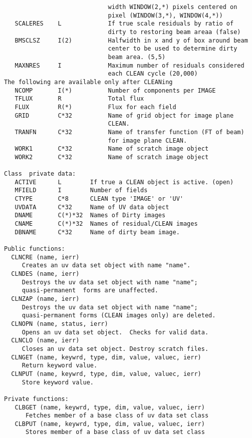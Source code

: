 {\begin{verbatim}
                             width WINDOW(2,*) pixels centered on
                             pixel (WINDOW(3,*), WINDOW(4,*))
   SCALERES    L             If true scale residuals by ratio of
                             dirty to restoring beam areaa (false)
   BMSCLSZ     I(2)          Halfwidth in x and y of box around beam
                             center to be used to determine dirty
                             beam area. (5,5)
   MAXNRES     I             Maximum number of residuals considered
                             each CLEAN cycle (20,000)
The following are available only after CLEANing
   NCOMP       I(*)          Number of components per IMAGE
   TFLUX       R             Total flux
   FLUX        R(*)          Flux for each field
   GRID        C*32          Name of grid object for image plane
                             CLEAN.
   TRANFN      C*32          Name of transfer function (FT of beam)
                             for image plane CLEAN.
   WORK1       C*32          Name of scratch image object
   WORK2       C*32          Name of scratch image object

Class  private data:
   ACTIVE      L        If true a CLEAN object is active. (open)
   MFIELD      I        Number of fields
   CTYPE       C*8      CLEAN type 'IMAGE' or 'UV'
   UVDATA      C*32     Name of UV data object
   DNAME       C(*)*32  Names of Dirty images
   CNAME       C(*)*32  Names of residual/CLEAN images
   DBNAME      C*32     Name of dirty beam image.

Public functions:
  CLNCRE (name, ierr)
     Creates an uv data set object with name "name".
  CLNDES (name, ierr)
     Destroys the uv data set object with name "name";
     quasi-permanent  forms are unaffected.
  CLNZAP (name, ierr)
     Destroys the uv data set object with name "name";
     quasi-permanent forms (CLEAN images only) are deleted.
  CLNOPN (name, status, ierr)
     Opens an uv data set object.  Checks for valid data.
  CLNCLO (name, ierr)
     Closes an uv data set object. Destroy scratch files.
  CLNGET (name, keywrd, type, dim, value, valuec, ierr)
     Return keyword value.
  CLNPUT (name, keywrd, type, dim, value, valuec, ierr)
     Store keyword value.

Private functions:
   CLBGET (name, keywrd, type, dim, value, valuec, ierr)
      Fetches member of a base class of uv data set class
   CLBPUT (name, keywrd, type, dim, value, valuec, ierr)
      Stores member of a base class of uv data set class
\end{verbatim}}

